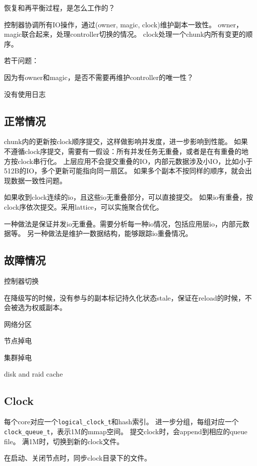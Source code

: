 恢复和再平衡过程，是怎么工作的？

控制器协调所有IO操作，通过(owner, magic, clock)维护副本一致性。
owner，magic联合起来，处理controller切换的情况。
clock处理一个chunk内所有变更的顺序。

若干问题：
\begin{enumbox}
\item 因为有owner和magic，是否不需要再维护controller的唯一性？
\item 没有使用日志
\end{enumbox}

\subsection{正常情况}

chunk内的更新按clock顺序提交，这样做影响并发度，进一步影响到性能。
如果不遵循clock序提交，需要有一假设：所有并发任务无重叠，或者是在有重叠的地方按clock串行化。
上层应用不会提交重叠的IO，内部元数据涉及小IO，比如小于512B的IO，多个更新可能指向同一扇区。
如果多个副本不按同样的顺序，就会出现数据一致性问题。

如果收到clock连续的io，且这些io无重叠部分，可以直接提交。
如果io有重叠，按clock序依次提交。采用lattice，可以实施聚合优化。

一种做法是保证并发io无重叠。需要分析每一种io情况，包括应用层io，内部元数据等。
另一种做法是维护一数据结构，能够跟踪io重叠情况。

\subsection{故障情况}

控制器切换

在降级写的时候，没有参与的副本标记持久化状态stale，保证在reload的时候，不会被选为权威副本。

网络分区

节点掉电

集群掉电

disk and raid cache

\subsection{Clock}

每个core对应一个\verb|logical_clock_t|和hash索引。
进一步分组，每组对应一个\verb|clock_queue_t|，表示1M的mmap空间。
提交clock时，会append到相应的queue file。
满1M时，切换到新的clock文件。

在启动、关闭节点时，同步clock目录下的文件。

